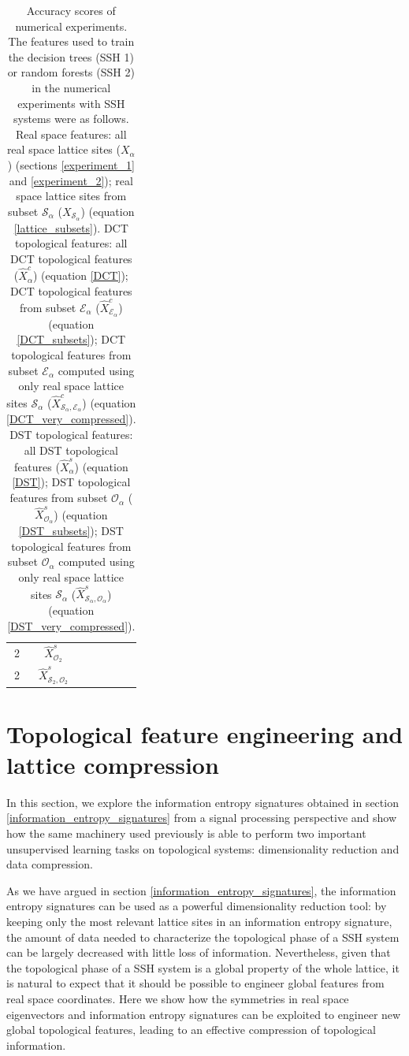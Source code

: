 \documentclass[10pt]{revtex4-1}
\newcommand\accPrec{4}  %
\newcommand{\tableRow}[1]{\\[#1 cm]}
\newcommand\tableRowEnd{\tableRow{0.15}}
\newcommand\xsOTwo{$\hat{X}^s_{\mathcal{O}_2}$}
\newcommand\xsOTwoEigVal{\fpeval{round(0.9042001086956524,\accPrec)}}
\newcommand\xsOTwoEigTest{\fpeval{round(0.552662980209546,\accPrec)}}
\newcommand\xsOTwoHamVal{\fpeval{round(0.9917789855072465,\accPrec)}}
\newcommand\xsOTwoHamTest{\fpeval{round(0.7427124563445866,\accPrec)}}
\newcommand\xsSOTwo{$\hat{X}^s_{\mathcal{S}_2,\mathcal{O}_2}$}
\newcommand\xsSOTwoEigVal{\fpeval{round(0.8203919927536232,\accPrec)}}
\newcommand\xsSOTwoEigTest{\fpeval{round(0.41268987194412105,\accPrec)}}
\newcommand\xsSOTwoHamVal{\fpeval{round(0.9941884057971013,\accPrec)}}
\newcommand\xsSOTwoHamTest{\fpeval{round(0.5903026775320139,\accPrec)}}
\newcommand\xalpha{$X_\alpha$}
\newcommand\xSalpha{$X_{\mathcal{S}_\alpha}$}
\newcommand\xcalpha{$\hat{X}^c_\alpha$}
\newcommand\xcEalpha{$\hat{X}^c_{\mathcal{E}_\alpha}$}
\newcommand\xcSEalpha{$\hat{X}^c_{\mathcal{S}_\alpha,\mathcal{E}_\alpha}$}
\newcommand\xsalpha{$\hat{X}^s_\alpha$}
\newcommand\xsOalpha{$\hat{X}^s_{\mathcal{O}_\alpha}$}
\newcommand\xsSOalpha{$\hat{X}^s_{\mathcal{S}_\alpha,\mathcal{O}_\alpha}$}
\begin{document}
\begin{table}
\begin{tabular}{||c@{\hskip 0.3in} c@{\hskip 0.3in} c@{\hskip 0.3in} c@{\hskip 0.3in} c@{\hskip 0.3in} c||}
2                     &\xsOTwo           &\xsOTwoEigVal      &\xsOTwoEigTest     &\xsOTwoHamVal        &\xsOTwoHamTest     \tableRowEnd
2                     &\xsSOTwo          &\xsSOTwoEigVal     &\xsSOTwoEigTest    &\xsSOTwoHamVal       &\xsSOTwoHamTest    \tableRowEnd
\bottomrule
\end{tabular}
\caption{\label{accuracy_scores}Accuracy scores of numerical experiments. The features used to train the decision trees (SSH 1) or random forests (SSH 2) in the numerical experiments with SSH systems were as follows. Real space features: all real space lattice sites (\xalpha) (sections \ref{experiment_1} and \ref{experiment_2}); real space lattice sites from subset $\mathcal{S}_{\alpha}$ (\xSalpha) (equation \eqref{lattice_subsets}). DCT topological features: all DCT topological features (\xcalpha) (equation \eqref{DCT}); DCT topological features from subset $\mathcal{E}_\alpha$ (\xcEalpha) (equation \eqref{DCT_subsets}); DCT topological features from subset $\mathcal{E}_\alpha$ computed using only real space lattice sites $\mathcal{S}_{\alpha}$ (\xcSEalpha) (equation \eqref{DCT_very_compressed}). DST topological features: all DST topological features (\xsalpha) (equation \eqref{DST}); DST topological features from subset $\mathcal{O}_\alpha$ (\xsOalpha) (equation \eqref{DST_subsets}); DST topological features from subset $\mathcal{O}_\alpha$ computed using only real space lattice sites $\mathcal{S}_{\alpha}$ (\xsSOalpha) (equation \eqref{DST_very_compressed}). }
\end{table}




\section{Topological feature engineering and lattice compression}
\label{topological_feature_engineering}

In this section, we explore the information entropy signatures obtained in section \ref{information_entropy_signatures} from a signal processing perspective and show how the same machinery used previously is able to perform two important unsupervised learning tasks on topological systems: dimensionality reduction and data compression. 

As we have argued in section \ref{information_entropy_signatures}, the information entropy signatures can be used as a powerful dimensionality reduction tool: by keeping only the most relevant lattice sites in an information entropy signature, the amount of data needed to characterize the topological phase of a SSH system can be largely decreased with little loss of information. Nevertheless, given that the topological phase of a SSH system is a global property of the whole lattice, it is natural to expect that it should be possible to engineer global features from real space coordinates. Here we show how the symmetries in real space eigenvectors and information entropy signatures can be exploited to engineer new global topological features, leading to an effective compression of topological information.
\end{document}
